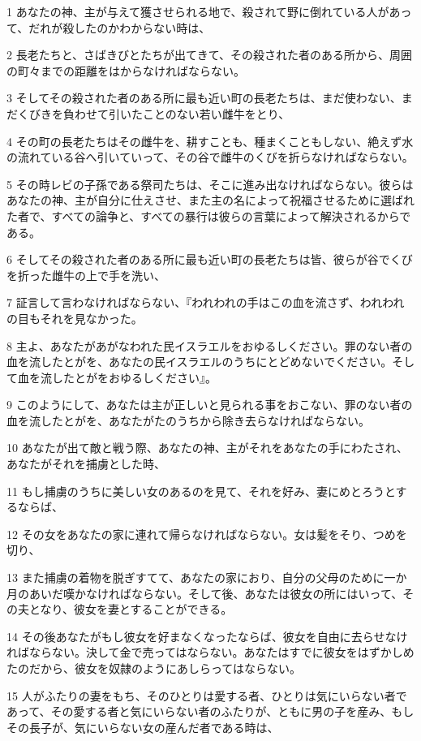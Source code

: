 \par 1 あなたの神、主が与えて獲させられる地で、殺されて野に倒れている人があって、だれが殺したのかわからない時は、
\par 2 長老たちと、さばきびとたちが出てきて、その殺された者のある所から、周囲の町々までの距離をはからなければならない。
\par 3 そしてその殺された者のある所に最も近い町の長老たちは、まだ使わない、まだくびきを負わせて引いたことのない若い雌牛をとり、
\par 4 その町の長老たちはその雌牛を、耕すことも、種まくこともしない、絶えず水の流れている谷へ引いていって、その谷で雌牛のくびを折らなければならない。
\par 5 その時レビの子孫である祭司たちは、そこに進み出なければならない。彼らはあなたの神、主が自分に仕えさせ、また主の名によって祝福させるために選ばれた者で、すべての論争と、すべての暴行は彼らの言葉によって解決されるからである。
\par 6 そしてその殺された者のある所に最も近い町の長老たちは皆、彼らが谷でくびを折った雌牛の上で手を洗い、
\par 7 証言して言わなければならない、『われわれの手はこの血を流さず、われわれの目もそれを見なかった。
\par 8 主よ、あなたがあがなわれた民イスラエルをおゆるしください。罪のない者の血を流したとがを、あなたの民イスラエルのうちにとどめないでください。そして血を流したとがをおゆるしください』。
\par 9 このようにして、あなたは主が正しいと見られる事をおこない、罪のない者の血を流したとがを、あなたがたのうちから除き去らなければならない。
\par 10 あなたが出て敵と戦う際、あなたの神、主がそれをあなたの手にわたされ、あなたがそれを捕虜とした時、
\par 11 もし捕虜のうちに美しい女のあるのを見て、それを好み、妻にめとろうとするならば、
\par 12 その女をあなたの家に連れて帰らなければならない。女は髪をそり、つめを切り、
\par 13 また捕虜の着物を脱ぎすてて、あなたの家におり、自分の父母のために一か月のあいだ嘆かなければならない。そして後、あなたは彼女の所にはいって、その夫となり、彼女を妻とすることができる。
\par 14 その後あなたがもし彼女を好まなくなったならば、彼女を自由に去らせなければならない。決して金で売ってはならない。あなたはすでに彼女をはずかしめたのだから、彼女を奴隷のようにあしらってはならない。
\par 15 人がふたりの妻をもち、そのひとりは愛する者、ひとりは気にいらない者であって、その愛する者と気にいらない者のふたりが、ともに男の子を産み、もしその長子が、気にいらない女の産んだ者である時は、
